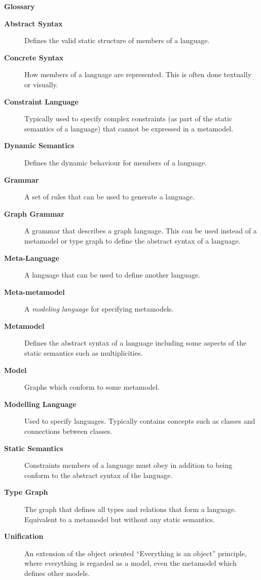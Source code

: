\newpage
{}
{}

\vspace{1cm}
{\Huge \bf Glossary}
\vspace{1cm}

\begin{description}

\item[\bf Abstract Syntax] 
Defines the valid static structure of members of a language. 

\item[\bf Concrete Syntax]
How members of a language are represented. This is often done textually or visually.

\item[\bf Constraint Language] 
Typically used to specify complex constraints (as part of the static semantics of a language) that cannot be expressed in a metamodel.

\item[\bf Dynamic Semantics] 
Defines the dynamic behaviour for members of a language.

\item[\bf Grammar] 
A set of rules that can be used to generate a language. 

\item[\bf Graph Grammar] 
A grammar that describes a graph language. This can be used instead of a metamodel or type graph to define the abstract syntax of a language.

\item[\bf Meta-Language] 
A language that can be used to define another language.

\item[\bf Meta-metamodel] 
A \emph{modeling language} for specifying metamodels.

\item[\bf Metamodel] 
Defines the abstract syntax of a language including some aspects of the static semantics such as multiplicities. 

\item[\bf Model] 
Graphs which conform to some metamodel.

\item[\bf Modelling Language] 
Used to specify languages. Typically contains concepts such as classes and connections between classes.

\item[\bf Static Semantics] 
Constraints members of a language must obey in addition to being conform to the abstract syntax of the language.

\item[\bf Type Graph] 
The graph that defines all types and relations that form a language. Equivalent to a metamodel but without any static semantics.

\item[\bf Unification]  
An extension of the object oriented ``Everything is an object'' principle, where everything is regarded as a model, even the metamodel which defines other
models.

\end{description}
